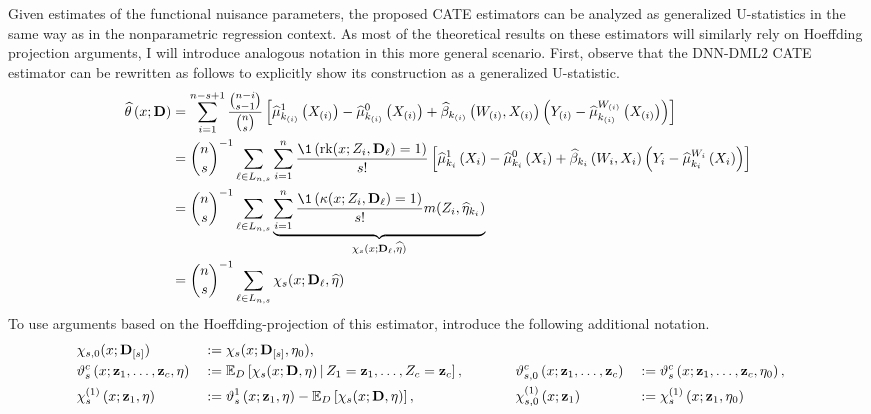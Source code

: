 Given estimates of the functional nuisance parameters, the proposed CATE estimators can be analyzed as generalized U-statistics in the same way as in the nonparametric regression context.
As most of the theoretical results on these estimators will similarly rely on Hoeffding projection arguments, I will introduce analogous notation in this more general scenario.
First, observe that the DNN-DML2 CATE estimator can be rewritten as follows to explicitly show its construction as a generalized U-statistic.
\begin{equation}
    \begin{aligned}
        \hat{\theta}\left(x; \mathbf{D}\right) 
        & = \sum_{i = 1}^{n - s + 1} \frac{\binom{n-i}{s-1}}{\binom{n}{s}}
		\left[\hat{\mu}_{k_{(i)}}^{1}\left(X_{(i)}\right) - \hat{\mu}_{k_{(i)}}^{0}\left(X_{(i)}\right) + \hat{\beta}_{k_{(i)}}\left(W_{(i)}, X_{(i)}\right)\left(Y_{(i)} - \hat{\mu}^{W_{(i)}}_{k_{(i)}}\left(X_{(i)}\right)\right)\right] \\
        & = \binom{n}{s}^{-1} \sum_{\ell \in L_{n,s}}
        \sum_{i = 1}^{n}\frac{\1\left(\rk(x; Z_{i}, \mathbf{D}_{\ell}) = 1\right)}{s!} 
        \left[\hat{\mu}_{k_i}^{1}\left(X_{i}\right) - \hat{\mu}_{k_i}^{0}\left(X_{i}\right) + \hat{\beta}_{k_i}\left(W_{i}, X_{i}\right)\left(Y_{i} - \hat{\mu}^{W_{i}}_{k_i}\left(X_{i}\right)\right)\right] \\
        & = \binom{n}{s}^{-1} \sum_{\ell \in L_{n,s}}
        \underbrace{\sum_{i = 1}^{n}\frac{\1\left(\kappa(x; Z_{i}, \mathbf{D}_{\ell}) = 1\right)}{s!} 
        m(Z_{i}, \hat{\eta}_{k_i})}_{\chi_{s}(x; \mathbf{D}_{\ell}, \hat{\eta})} \\
        & = \binom{n}{s}^{-1} \sum_{\ell \in L_{n,s}}\chi_{s}(x; \mathbf{D}_{\ell}, \hat{\eta})
    \end{aligned}
\end{equation}
To use arguments based on the Hoeffding-projection of this estimator, introduce the following additional notation.
\begin{alignat}{4}
    &\chi_{s, 0}(x; \mathbf{D}_{[s]})
    & \; := \; &\chi_{s}(x; \mathbf{D}_{[s]}, \eta_{0}),\\
    &\vartheta_{s}^{c}\left(x; \mathbf{z}_{1}, \dotsc, \mathbf{z}_{c}, \eta\right)
    & \; := \; &\mathbb{E}_{D}\left[\chi_{s}(x; \mathbf{D}, \eta) \, \middle| \, Z_1 = \mathbf{z}_1, \dotsc, Z_c = \mathbf{z}_c\right], &
    \hspace{1cm}
    &\vartheta_{s,0}^{c}\left(x; \mathbf{z}_{1}, \dotsc, \mathbf{z}_{c}\right)
    & \; := \; &\vartheta_{s}^{c}\left(x; \mathbf{z}_{1}, \dotsc, \mathbf{z}_{c}, \eta_{0}\right), \\
    &\chi_{s}^{(1)}\left(x; \mathbf{z}_{1}, \eta\right)
	& \; := \; &\vartheta_{s}^{1}\left(x; \mathbf{z}_{1}, \eta\right)
    - \mathbb{E}_{D}\left[\chi_{s}(x; \mathbf{D}, \eta)\right], &
    \hspace{1cm}
    &\chi_{s,0}^{(1)}\left(x; \mathbf{z}_{1}\right)
	& \; := \; &\chi_{s}^{(1)}\left(x; \mathbf{z}_{1}, \eta_{0}\right)
\end{alignat}
